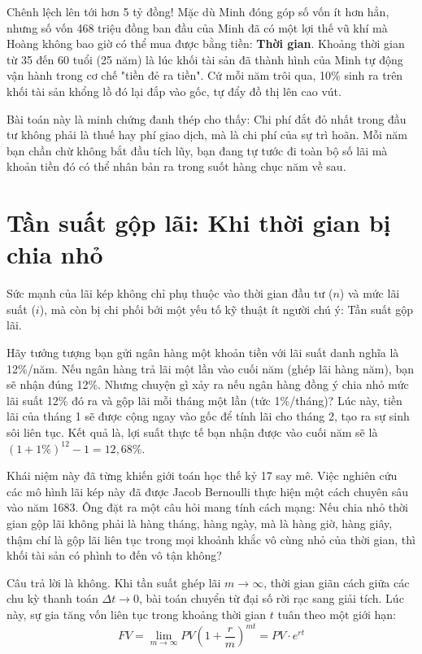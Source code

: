 \documentclass[14pt, a4paper, oneside]{extreport}
\begin{document}
Chênh lệch lên tới hơn 5 tỷ đồng! Mặc dù Minh đóng góp số vốn ít hơn hẳn, nhưng số vốn 468 triệu đồng ban đầu của Minh đã có một lợi thế vũ khí mà Hoàng không bao giờ có thể mua được bằng tiền: \textbf{Thời gian}. Khoảng thời gian từ 35 đến 60 tuổi (25 năm) là lúc khối tài sản đã thành hình của Minh tự động vận hành trong cơ chế "tiền đẻ ra tiền". Cứ mỗi năm trôi qua, 10\% sinh ra trên khối tài sản khổng lồ đó lại đắp vào gốc, tự đẩy đồ thị lên cao vút.

Bài toán này là minh chứng đanh thép cho thấy: Chi phí đắt đỏ nhất trong đầu tư không phải là thuế hay phí giao dịch, mà là chi phí của sự trì hoãn. Mỗi năm bạn chần chừ không bắt đầu tích lũy, bạn đang tự tước đi toàn bộ số lãi mà khoản tiền đó có thể nhân bản ra trong suốt hàng chục năm về sau.

\section{Tần suất gộp lãi: Khi thời gian bị chia nhỏ}

Sức mạnh của lãi kép không chỉ phụ thuộc vào thời gian đầu tư ($n$) và mức lãi suất ($i$), mà còn bị chi phối bởi một yếu tố kỹ thuật ít người chú ý: Tần suất gộp lãi.

Hãy tưởng tượng bạn gửi ngân hàng một khoản tiền với lãi suất danh nghĩa là 12\%/năm. Nếu ngân hàng trả lãi một lần vào cuối năm (ghép lãi hàng năm), bạn sẽ nhận đúng 12\%. Nhưng chuyện gì xảy ra nếu ngân hàng đồng ý chia nhỏ mức lãi suất 12\% đó ra và gộp lãi mỗi tháng một lần (tức 1\%/tháng)? Lúc này, tiền lãi của tháng 1 sẽ được cộng ngay vào gốc để tính lãi cho tháng 2, tạo ra sự sinh sôi liên tục. Kết quả là, lợi suất thực tế bạn nhận được vào cuối năm sẽ là $(1 + 1\%)^{12} - 1 = 12,68\%$. 

Khái niệm này đã từng khiến giới toán học thế kỷ 17 say mê. Việc nghiên cứu các mô hình lãi kép này đã được Jacob Bernoulli thực hiện một cách chuyên sâu vào năm 1683. Ông đặt ra một câu hỏi mang tính cách mạng: Nếu chia nhỏ thời gian gộp lãi không phải là hàng tháng, hàng ngày, mà là hàng giờ, hàng giây, thậm chí là gộp lãi liên tục trong mọi khoảnh khắc vô cùng nhỏ của thời gian, thì khối tài sản có phình to đến vô tận không?

Câu trả lời là không. Khi tần suất ghép lãi $m \to \infty$, thời gian giãn cách giữa các chu kỳ thanh toán $\Delta t \to 0$, bài toán chuyển từ đại số rời rạc sang giải tích. Lúc này, sự gia tăng vốn liên tục trong khoảng thời gian $t$ tuân theo một giới hạn: 
\begin{equation}
    FV = \lim_{m \to \infty} PV \left(1 + \frac{r}{m}\right)^{mt} = PV \cdot e^{rt}
\end{equation}
\end{document}
